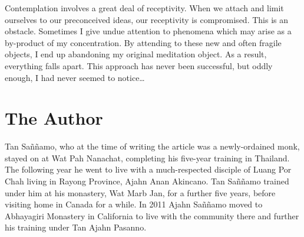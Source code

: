 Contemplation involves a great deal of receptivity. When we attach and
limit ourselves to our preconceived ideas, our receptivity is
compromised. This is an obstacle. Sometimes I give undue attention to
phenomena which may arise as a by-product of my concentration. By
attending to these
new and often fragile objects, I end up abandoning my original
meditation object. As a result, everything falls apart. This approach
has never been successful, but oddly enough, I had never seemed to
notice\ldots{}

\dividerRule

\section{The Author}

Tan Saññamo, who at the time of writing the article was a
newly-ordained monk, stayed on at Wat Pah Nanachat, completing his
five-year training in Thailand. The following year he went to live with
a much-respected disciple of Luang Por Chah living in Rayong Province, 
Ajahn Anan Akincano. Tan Saññamo trained under him at his monastery, Wat
Marb Jan, for a further five years, before visiting home in Canada for a
while. In 2011 Ajahn Saññamo moved to Abhayagiri Monastery in California
to live with the community there and further his training under Tan
Ajahn Pasanno.

